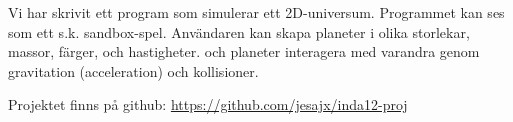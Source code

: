 Vi har skrivit ett program som simulerar ett 2D-universum.
Programmet kan ses som ett s.k. sandbox-spel.
Användaren kan skapa planeter i olika
storlekar, massor, färger, och hastigheter.
och planeter interagera med varandra genom gravitation (acceleration)
och kollisioner.

Projektet finns på github:
\url{https://github.com/jesajx/inda12-proj}
